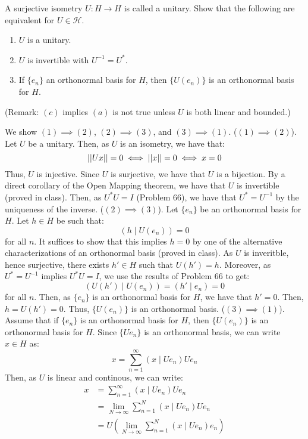 \documentclass[12pt]{article}
\begin{document}
\begin{problem}{67}
    A surjective isometry $U: H \to H$ is called a unitary. Show that the following are equivalent for $U \in \mathcal{H}$. 
    \begin{enumerate}
        \item $U$ is a unitary.
        \item $U$ is invertible with $U^{-1} = U^*$.
        \item If $\{e_n\}$ an orthonormal basis for $H$, then $\{U(e_n)\}$ is an orthonormal basis for $H$.
    \end{enumerate}
    (Remark: $(c)$ implies $(a)$ is not true unless $U$ is both linear and bounded.)
\end{problem}
\begin{solution}
    We show $(1) \implies (2)$, $(2) \implies (3)$, and $(3) \implies (1)$. \bbni
    ($(1) \implies (2)$). Let $U$ be a unitary. Then, as $U$ is an isometry, we have that: 
    \[ \left\vert\left\vert Ux\right\vert\right\vert = 0 \iff \left\vert\left\vert x\right\vert\right\vert = 0 \iff x = 0\]
    Thus, $U$ is injective. Since $U$ is surjective, we have that $U$ is a bijection. By a direct corollary of the Open Mapping theorem, we have that $U$ is invertible (proved in class). Then, as $U^*U = I$ (Problem 66), we have that $U^* = U^{-1}$ by the uniqueness of the inverse. \bbni 
    ($(2) \implies (3)$). Let $\{e_n\}$ be an orthonormal basis for $H$. Let $h \in H$ be such that:
    \[ (h \mid U(e_n)) = 0\]
    for all $n$. It suffices to show that this implies $h = 0$ by one of the alternative characterizations of an orthonormal basis (proved in class). \bbni 
    As $U$ is inveritble, hence surjective, there exists $h' \in H$ such that $U(h') = h$. Moreover, as $U^* = U^{-1}$ implies $U^*U = I$, we use the results of Problem 66 to get:
    \[ (U(h') \mid U(e_n)) = (h' \mid e_n) = 0\]
    for all $n$. Then, as $\{e_n\}$ is an orthonormal basis for $H$, we have that $h' = 0$. Then, $h = U(h') = 0$. Thus, $\{U(e_n)\}$ is an orthonormal basis.  \bbni
    ($(3) \implies (1)$). Assume that if $\{e_n\}$ is an orthonormal basis for $H$, then $\{U(e_n)\}$ is an orthonormal basis for $H$. Since $\{Ue_n\}$ is an orthonormal basis, we can write $x \in H$ as:
    \[ x = \sum_{n=1}^\infty (x \mid Ue_n)Ue_n\]
    Then, as $U$ is linear and continous, we can write:
    \begin{align*}
        x &= \sum_{n=1}^\infty (x \mid Ue_n)Ue_n \\
        &= \lim_{N \to \infty} \sum_{n=1}^N (x \mid Ue_n)Ue_n \\
        &= U\left(\lim_{N \to \infty} \sum_{n=1}^N (x \mid Ue_n)e_n\right) \\

\end{align*}
\end{solution}
\end{document}
